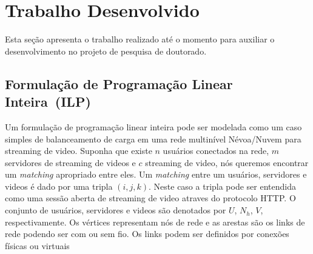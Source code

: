 \clearpage
\section{Trabalho Desenvolvido}
\label{ch:developed}

Esta seção apresenta o trabalho realizado até o momento para auxiliar o desenvolvimento 
no projeto de pesquisa de doutorado. 



%

\subsection{Formulação de Programação Linear Inteira~(ILP)}
\label{subsec:applications}

Um formulação de programação linear inteira pode ser modelada como um caso simples de balanceamento de carga em uma rede multinível Névoa/Nuvem para streaming de video.
Suponha que existe $n$ usuários conectados na rede, $m$ servidores de streaming de videos e $c$ streaming de video, nós queremos encontrar um \textit{matching} apropriado entre eles. Um \textit{matching} entre um usuários, servidores e videos é dado por uma tripla $(i,j,k)$. Neste caso a tripla pode ser entendida como uma sessão aberta de streaming de video atraves do protocolo HTTP. O conjunto de usuários, servidores e videos são denotados por $U$, $N_{h}$, $V$, respectivamente.
Os vértices representam nós de rede e as arestas são os links de rede podendo ser com ou sem fio. Os links podem ser definidos por conexões físicas ou virtuais

